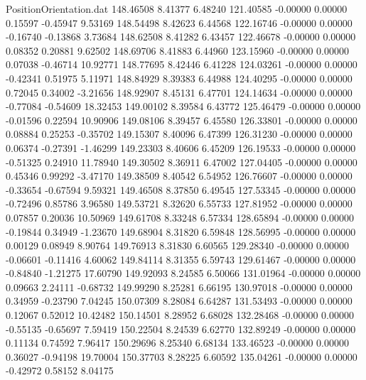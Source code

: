 \begin{filecontents}{PositionOrientation.dat}
 148.46508    8.41377    6.48240   121.40585   -0.00000    0.00000    0.15597   -0.45947    9.53169
 148.54498    8.42623    6.44568   122.16746   -0.00000    0.00000   -0.16740   -0.13868    3.73684
 148.62508    8.41282    6.43457   122.46678   -0.00000    0.00000    0.08352    0.20881    9.62502
 148.69706    8.41883    6.44960   123.15960   -0.00000    0.00000    0.07038   -0.46714   10.92771
 148.77695    8.42446    6.41228   124.03261   -0.00000    0.00000   -0.42341    0.51975    5.11971
 148.84929    8.39383    6.44988   124.40295   -0.00000    0.00000    0.72045    0.34002   -3.21656
 148.92907    8.45131    6.47701   124.14634   -0.00000    0.00000   -0.77084   -0.54609   18.32453
 149.00102    8.39584    6.43772   125.46479   -0.00000    0.00000   -0.01596    0.22594   10.90906
 149.08106    8.39457    6.45580   126.33801   -0.00000    0.00000    0.08884    0.25253   -0.35702
 149.15307    8.40096    6.47399   126.31230   -0.00000    0.00000    0.06374   -0.27391   -1.46299
 149.23303    8.40606    6.45209   126.19533   -0.00000    0.00000   -0.51325    0.24910   11.78940
 149.30502    8.36911    6.47002   127.04405   -0.00000    0.00000    0.45346    0.99292   -3.47170
 149.38509    8.40542    6.54952   126.76607   -0.00000    0.00000   -0.33654   -0.67594    9.59321
 149.46508    8.37850    6.49545   127.53345   -0.00000    0.00000   -0.72496    0.85786    3.96580
 149.53721    8.32620    6.55733   127.81952   -0.00000    0.00000    0.07857    0.20036   10.50969
 149.61708    8.33248    6.57334   128.65894   -0.00000    0.00000   -0.19844    0.34949   -1.23670
 149.68904    8.31820    6.59848   128.56995   -0.00000    0.00000    0.00129    0.08949    8.90764
 149.76913    8.31830    6.60565   129.28340   -0.00000    0.00000   -0.06601   -0.11416    4.60062
 149.84114    8.31355    6.59743   129.61467   -0.00000    0.00000   -0.84840   -1.21275   17.60790
 149.92093    8.24585    6.50066   131.01964   -0.00000    0.00000    0.09663    2.24111   -0.68732
 149.99290    8.25281    6.66195   130.97018   -0.00000    0.00000    0.34959   -0.23790    7.04245
 150.07309    8.28084    6.64287   131.53493   -0.00000    0.00000    0.12067    0.52012   10.42482
 150.14501    8.28952    6.68028   132.28468   -0.00000    0.00000   -0.55135   -0.65697    7.59419
 150.22504    8.24539    6.62770   132.89249   -0.00000    0.00000    0.11134    0.74592    7.96417
 150.29696    8.25340    6.68134   133.46523   -0.00000    0.00000    0.36027   -0.94198   19.70004
 150.37703    8.28225    6.60592   135.04261   -0.00000    0.00000   -0.42972    0.58152    8.04175

\end{filecontents}
